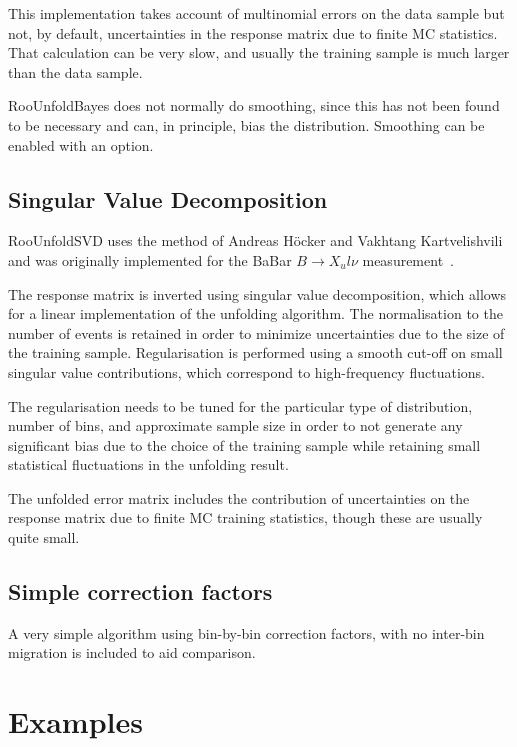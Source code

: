 \documentclass{desyproc}
\begin{document}
This implementation takes account of multinomial errors on the data sample but not,
by default, uncertainties in the response matrix due to finite MC statistics.
That calculation can be very slow, and usually the training sample is much larger
than the data sample.

RooUnfoldBayes does not normally do smoothing, since this has not been found to be necessary
and can, in principle, bias the distribution. Smoothing can be enabled with an option.

\subsection{Singular Value Decomposition}

RooUnfoldSVD uses the method of Andreas H\"ocker and Vakhtang Kartvelishvili~\cite{Hocker:1995kb}
and was originally implemented for the BaBar $B \rightarrow X_ul\nu$ measurement~\cite{Tackmann:2008qa}.

The response matrix is inverted using singular value decomposition,
which allows for a linear implementation of the unfolding algorithm.
The normalisation to the number of events is retained in order to minimize
uncertainties due to the size of the training sample.
Regularisation is performed using a smooth cut-off on small singular value contributions,
which correspond to high-frequency fluctuations.

The regularisation needs to be tuned for the particular type of distribution, number of bins, and approximate sample size
in order to not generate any significant bias due to the choice of the training sample
while retaining small statistical fluctuations in the unfolding result.

The unfolded error matrix includes the contribution of uncertainties on the
response matrix due to finite MC training statistics, though these are usually quite small.

\subsection{Simple correction factors}

A very simple algorithm using bin-by-bin correction factors,
with no inter-bin migration is included to aid comparison.

\section{Examples\label{sec:adye:examples}}
\end{document}
